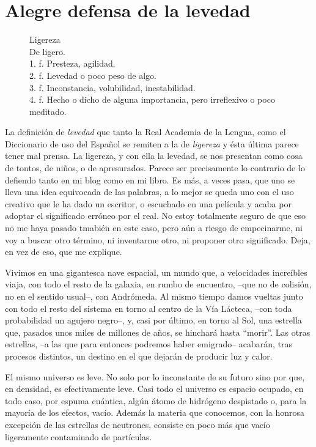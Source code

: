 \chapter{Alegre defensa de la levedad}

\begin{figure}
\begin{description}
\item{Ligereza}\\
De ligero.\\
1. f. Presteza, agilidad.\\
2. f. Levedad o poco peso de algo.\\
3. f. Inconstancia, volubilidad, inestabilidad.\\
4. f. Hecho o dicho de alguna importancia, pero irreflexivo o poco meditado.\\
\end{description}
\end{figure}

La definición de \emph{levedad} que tanto la Real Academia de la Lengua, como el Diccionario de uso del Español se remiten a la de \emph{ligereza} y ésta última parece tener mal prensa. La ligereza, y con ella la levedad, se nos presentan como cosa de tontos, de niños, o de apresurados. Parece ser precisamente lo contrario de lo defiendo tanto en mi blog como en mi libro. Es más, a veces pasa, que uno se lleva una idea equivocada de las palabras, a lo mejor se queda uno con el uso creativo que le ha dado un escritor, o escuchado en una película y acaba por adoptar el significado erróneo por el real. No estoy totalmente seguro de que eso no me haya pasado tmabién en este caso, pero aún a riesgo de empecinarme, ni voy a buscar otro término, ni inventarme otro, ni proponer otro significado. Deja, en vez de eso, que me explique.

Vivimos en una gigantesca nave espacial, un mundo que, a velocidades increíbles viaja, con todo el resto de la galaxia, en rumbo de encuentro, --que no de colisión, no en el sentido usual--, con Andrómeda. Al mismo tiempo damos vueltas junto con todo el resto del sistema en torno al centro de la Vía Lácteca, --con toda probabilidad un agujero negro--, y, casi por último, en torno al Sol, una estrella que, pasados unos miles de millones de años, se hinchará hasta \enquote{morir}. Las otras estrellas, --a las que para entonces podremos haber emigrado-- acabarán, tras procesos distintos, un destino en el que dejarán de producir luz y calor. 

El mismo universo es leve. No solo por lo inconstante de su futuro sino por que, en densidad, es efectivamente leve. Casi todo el universo es espacio ocupado, en todo caso, por espuma cuántica, algún átomo de hidrógeno despistado o, para la mayoría de los efectos, vacío. Además la materia que conocemos, con la honrosa excepción de las estrellas de neutrones, consiste en poco más que vacío ligeramente contaminado de partículas.

